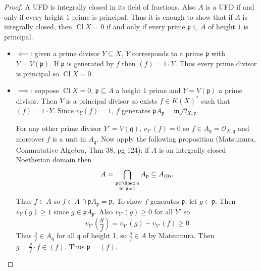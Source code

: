 \documentclass[a4paper]{article}
\newcommand{\sh}[1]{\mathcal{#1}} %
\DeclareMathOperator{\Cl}{Cl} %
\begin{document}
\begin{proof}
  A UFD is integrally closed in its field of fractions. Also \(A\) is a UFD if and only if every height 1 prime is principal. Thus it is enough to show that if \(A\) is integrally closed, then \(\Cl X = 0\) if and only if every prime \(\mathfrak p \subseteq A\) of height \(1\) is principal.
  \begin{itemize}
  \item \(\impliedby\): given a prime divisor \(Y \subseteq X\), \(Y\) corresponds to a prime \(\mathfrak p\) with \(Y = V(\mathfrak p)\). If \(\mathfrak p\) is generated by \(f\) then \((f) = 1 \cdot Y\). Thus every prime divisor is principal so \(\Cl X = 0\).
  \item \(\implies\): suppose \(\Cl X = 0\), \(\mathfrak p \subseteq A\) a height \(1\) prime and \(Y = V(\mathfrak p)\) a prime divisor. Then \(Y\) is a principal divisor so exists \(f \in K(X)^*\) such that \((f) = 1 \cdot Y\). Since \(v_Y(f) = 1\), \(f\) generates \(\mathfrak p A_{\mathfrak p} = \mathfrak m_{\mathfrak p} \sh O_{X, \mathfrak p}\).

    For any other prime divisor \(Y' = V(\mathfrak q)\), \(v_{Y'}(f) = 0\) so \(f \in A_{\mathfrak q} = \sh O_{X, \mathfrak q}\) and moreover \(f\) is a unit in \(A_{\mathfrak q}\). Now apply the following proposition (Matsumura, Commutative Algebra, Thm 38, pg 124): if \(A\) is an integrally closed Noetherian domain then
    \[
      A = \bigcap_{\substack{\mathfrak p \in \Spec A \\ \operatorname{ht} \mathfrak p = 1}} A_{\mathfrak p} \subseteq A_{(0)}.
    \]
    Thus \(f \in A\) so \(f \in A \cap \mathfrak p A_{\mathfrak p} = \mathfrak p\). To show \(f\) generates \(\mathfrak p\), let \(g \in \mathfrak p\). Then \(v_Y(g) \geq 1\) since \(g \in \mathfrak p A_{\mathfrak p}\). Also \(v_{Y'}(g) \geq 0\) for all \(Y'\) so
    \[
      v_{Y'}(\frac{g}{f}) = v_{Y'}(g) - v_{Y'}(f) \geq 0
    \]
    Thus \(\frac{g}{f} \in A_{\mathfrak q}\) for all \(\mathfrak q\) of height 1, so \(\frac{g}{f} \in A\) by Matsumura. Then \(g = \frac{g}{f} \cdot f \in (f)\). Thus \(\mathfrak p = (f)\).
  \end{itemize}
\end{proof}
\end{document}
